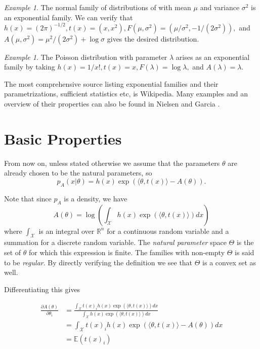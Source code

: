 \documentclass[BSc]{usydthesis}
\numberwithin{equation}{chapter}
\theoremstyle{remark}
\newtheorem{Example}[equation]{Example}
\newcommand{\la}{\lambda}
\begin{document}
\begin{Example} 
 The normal family of distributions of with mean $\mu$ and variance $\sigma^2$ is an exponential family. We can verify that $h(x) = (2\pi)^{-1/2}, t(x) = (x,x^2), F(\mu, \sigma^2) = (\mu/\sigma^2, -1/(2\sigma^2)),$ and $A(\mu, \sigma^2) = \mu^2/(2\sigma^2) + \log \sigma$ gives the desired distribution. 
\end{Example}

\begin{Example}
 The Poisson distribution with parameter $\la$ arises as an exponential family by taking $h(x) = 1/x!, t(x) = x, F(\la) = \log \la,$ and $A(\la) = \la.$
\end{Example}

The most comprehensive source listing exponential families and their parametrizations, sufficient statistics etc, is Wikipedia. Many examples and an overview of their properties can also be found in Nielsen and Garcia \cite{flash}.\\

\section{Basic Properties}

From now on, unless stated otherwise we assume that the parameters $\theta$ are already chosen to be the natural parameters, so $$p_{A}(x | \theta) = h(x) \exp( \langle \theta, t(x) \rangle - A(\theta)).$$

Note that since $p_{A}$ is a density, we have $$A(\theta) = \log \left( \int_{\mathcal{X}} h(x) \exp( \langle \theta, t(x) \rangle) dx \right)$$ where $\int_{\mathcal{X}}$ is an integral over $\mathbb{R}^n$ for a continuous random variable and a summation for a discrete random variable. The {\em natural parameter} space $\Theta$ is the set of $\theta$ for which this expression is finite. The families with non-empty $\Theta$ is said to be {\em regular}. By directly verifying the definition we see that $\Theta$ is a convex set as well.  

Differentiating this gives 

\begin{align*}
 \frac{ \partial A(\theta) }{\partial \theta_i} &= \frac{ \int_{\mathcal{X}} t(x)_i h(x) \exp( \langle \theta, t(x) \rangle) dx }{\int_{\mathcal{X}} h(x) \exp( \langle \theta, t(x) \rangle) dx}\\
 &=  \int_{\mathcal{X}} t(x)_i h(x) \exp( \langle \theta, t(x) \rangle - A(\theta)) dx\\
 &= \mathbb{E}(t(x)_i)
\end{align*}
\end{document}
